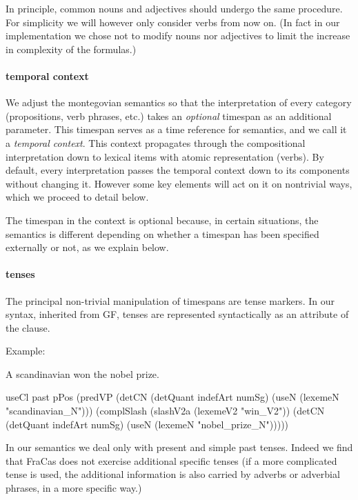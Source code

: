 \documentclass[a4paper,11pt]{article}
\begin{document}
In principle, common nouns and adjectives should undergo the same
procedure. For simplicity we will however only consider verbs from now
on. (In fact in our implementation we chose not to modify nouns nor
adjectives to limit the increase in complexity of the formulas.)

\paragraph{temporal context}

We adjust the montegovian semantics so that the interpretation of
every category (propositions, verb phrases, etc.) takes an
\emph{optional} timespan as an additional parameter. This timespan
serves as a time reference for semantics, and we call it a
\emph{temporal context}. This context propagates through the
compositional interpretation down to lexical items with atomic
representation (verbs). By default, every interpretation passes the
temporal context down to its components without changing it. However
some key elements will act on it on nontrivial ways, which we proceed
to detail below.

The timespan in the context is optional because, in certain
situations, the semantics is different depending on whether a timespan
has been specified externally or not, as we explain below.

\paragraph{tenses}

The principal non-trivial manipulation of timespans are tense
markers. In our syntax, inherited from GF, tenses are represented
syntactically as an attribute of the clause.

Example:

A scandinavian won the nobel prize.

useCl past pPos (predVP (detCN (detQuant indefArt numSg) (useN (lexemeN "scandinavian_N"))) (complSlash (slashV2a (lexemeV2 "win_V2")) (detCN (detQuant indefArt numSg) (useN (lexemeN "nobel_prize_N")))))

In our semantics we deal only with present and simple past
tenses.  Indeed we find that FraCas does not exercise additional
specific tenses (if a more complicated tense is used, the additional
information is also carried by adverbs or adverbial phrases, in a more
specific way.)
\end{document}
